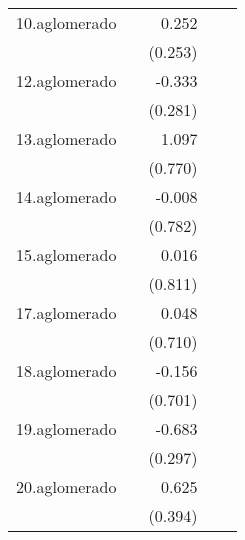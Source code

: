 {\begin{longtable}{l*{4}{D{.}{.}{-1}}}
\addlinespace
10.aglomerado&                     &       0.252         &                     &                     \\
            &                     &     (0.253)         &                     &                     \\
\addlinespace
12.aglomerado&                     &      -0.333         &                     &                     \\
            &                     &     (0.281)         &                     &                     \\
\addlinespace
13.aglomerado&                     &       1.097         &                     &                     \\
            &                     &     (0.770)         &                     &                     \\
\addlinespace
14.aglomerado&                     &      -0.008         &                     &                     \\
            &                     &     (0.782)         &                     &                     \\
\addlinespace
15.aglomerado&                     &       0.016         &                     &                     \\
            &                     &     (0.811)         &                     &                     \\
\addlinespace
17.aglomerado&                     &       0.048         &                     &                     \\
            &                     &     (0.710)         &                     &                     \\
\addlinespace
18.aglomerado&                     &      -0.156         &                     &                     \\
            &                     &     (0.701)         &                     &                     \\
\addlinespace
19.aglomerado&                     &      -0.683\sym{*}  &                     &                     \\
            &                     &     (0.297)         &                     &                     \\
\addlinespace
20.aglomerado&                     &       0.625         &                     &                     \\
            &                     &     (0.394)         &                     &                     \\

\end{longtable}}
